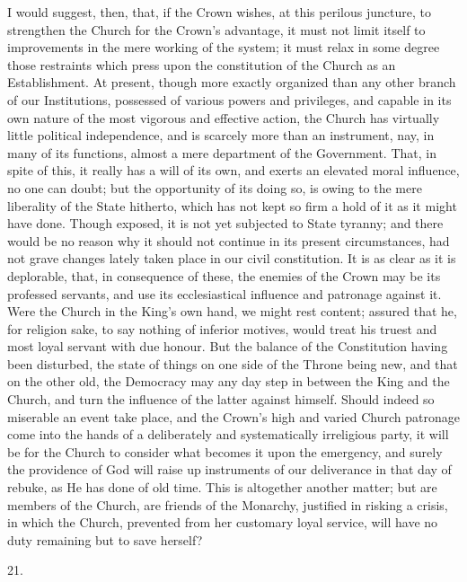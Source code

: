 I would suggest, then, that, if the Crown wishes,
at this perilous juncture, to strengthen the Church for the Crown's
advantage, it must not limit itself to improvements in the mere
working of the system; it must relax in some degree those restraints
which press upon the constitution of the Church as an Establishment.
At present, though more exactly organized than any other branch of our
Institutions, possessed of various powers and privileges, and capable
in its own nature of the most vigorous and effective action, the
Church has virtually little political independence, and is scarcely
more than an instrument, nay, in many of its functions, almost a mere
department of the Government. That, in spite of this, it really has a
will of its own, and exerts an elevated moral influence, no one can
doubt; but the opportunity of its doing so, is owing to the mere
liberality of the State hitherto, which has not kept so firm a hold of
it as it might have done. Though exposed, it is not yet subjected to
State tyranny; and there would be no reason why it should not continue
in its present circumstances, had not grave changes lately taken place
in our civil constitution. It is as clear as it is deplorable, that,
in consequence of these, the enemies of the Crown may be its professed
servants, and use its ecclesiastical influence and patronage against
it. Were the Church in the King's own hand, we might rest content;
assured that he, for religion sake, to say nothing of inferior
motives, would treat his truest and most loyal servant with due
honour. But the balance of the Constitution having been disturbed, the
state of things on one side of the Throne being new, and that on the
other old, the Democracy may any day step in between the King and the
Church, and turn the influence of the latter against himself. Should
indeed so miserable an event take place, and the Crown's high and
varied Church patronage come into the hands of a deliberately and
systematically irreligious party, it will be for the Church to
consider what becomes it upon the emergency, and surely the providence
of God will raise up instruments of our deliverance in that day of
rebuke, as He has done of old time. This is altogether another matter;
but are members of the Church, are friends of the Monarchy, justified
in risking a crisis, in which the Church, prevented from her customary
loyal service, will have no duty remaining but to save herself?

21.


